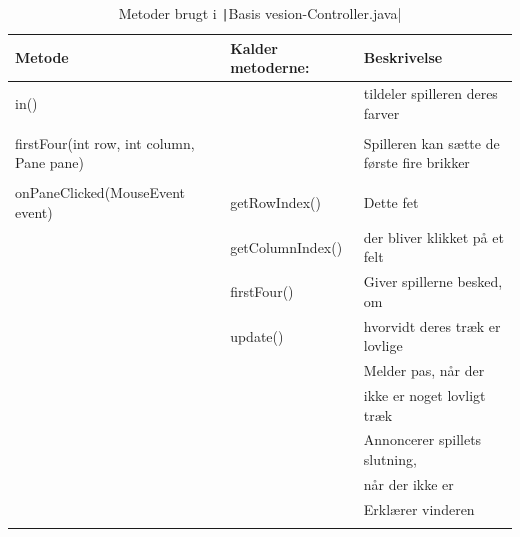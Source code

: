 \subsubsection{}
\begin{table}[H]
    \centering
    \caption{Metoder brugt i \texttt|Basis vesion-Controller.java|}\label{tbl:1}
    \begin{tabular}{lll}
        \toprule
    Metode          & Kalder metoderne: & Beskrivelse                                                         \\
        \midrule
       in()         &   & tildeler spilleren deres farver
             \\
             \\
        firstFour(int row, int column, Pane pane)   &  & Spilleren kan sætte de første fire brikker
        \\
        \\
         onPaneClicked(MouseEvent event) & getRowIndex()     & Dette fet                                         \\
                        & getColumnIndex()  & der bliver klikket på et felt                                     \\
                        & firstFour()       & Giver spillerne besked, om                                        \\
                        & update()  & hvorvidt deres træk er lovlige                                    \\
                        &                & Melder pas, når der                                               \\
                        &                & ikke er noget lovligt træk                                        \\
                        &                     & Annoncerer spillets slutning,                                     \\
                        &                   & når der ikke er                                                   \\
                        &                    & Erklærer vinderen                                      \\
                        &                   &                                                                   \\
                        

\end{tabular}
\end{table}
